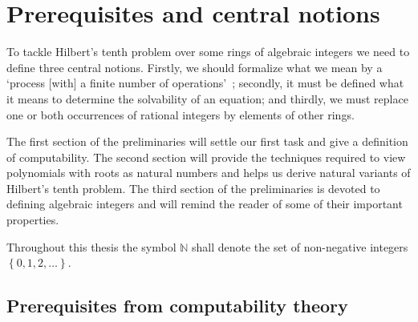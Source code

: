 \documentclass[12pt,a4paper]{scrbook}
\numberwithin{equation}{section}
\newcommand{\set}[1]{\left\lbrace #1 \right\rbrace}
\begin{document}



\allowdisplaybreaks

\frontmatter



\mainmatter


\chapter{Prerequisites and central notions}

To tackle Hilbert's tenth problem over some rings of algebraic integers we need
to define three central notions. Firstly, we should formalize what we mean by a
‘process [with] a finite number of operations’~\cite{Hilbert1900}; secondly, it
must be defined what it means to determine the solvability of an equation; and
thirdly, we must replace one or both occurrences of rational integers by
elements of other rings.

The first section of the preliminaries will settle our first task and give a
definition of computability. The second section will provide the techniques
required to view polynomials with roots as natural numbers and helps us derive
natural variants of Hilbert's tenth problem. The third section of the
preliminaries is devoted to defining algebraic integers and will remind the
reader of some of their important properties.

Throughout this thesis the symbol \(ℕ\) shall denote the set of non-negative
integers \(\set{0, 1, 2, …}\).

\section{Prerequisites from computability theory}%
\label{sec:computability theory}

\end{document}
